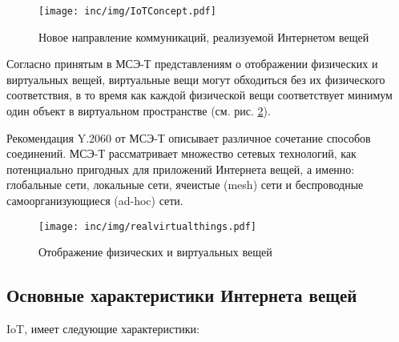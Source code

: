 \begin{figure}
  \centering
  \texttt{[image: inc/img/IoTConcept.pdf]}
	\caption{Новое направление коммуникаций, реализуемой Интернетом вещей}
  \label{fig:iotconcept}
\end{figure}

Согласно принятым в МСЭ-Т представлениям о отображении физических и виртуальных 
вещей, виртуальные вещи могут обходиться без их физического соответствия, в то 
время как каждой физической вещи соответствует минимум один объект в виртуальном 
пространстве (см. рис. \ref{fig:physvirtworld}).  

Рекомендация Y.2060 от МСЭ-Т описывает различное сочетание способов соединений.
МСЭ-Т рассматривает множество сетевых технологий, как потенциально пригодных для приложений Интернета вещей, а именно: глобальные сети, локальные сети, ячеистые (mesh) сети и беспроводные самоорганизующиеся (ad-hoc) сети.

\begin{figure}
  \centering
  \texttt{[image: inc/img/realvirtualthings.pdf]}
	\caption{Отображение физических и виртуальных вещей}
  \label{fig:physvirtworld}
\end{figure}

\subsection{Основные характеристики Интернета вещей}

IoT, имеет следующие характеристики:


